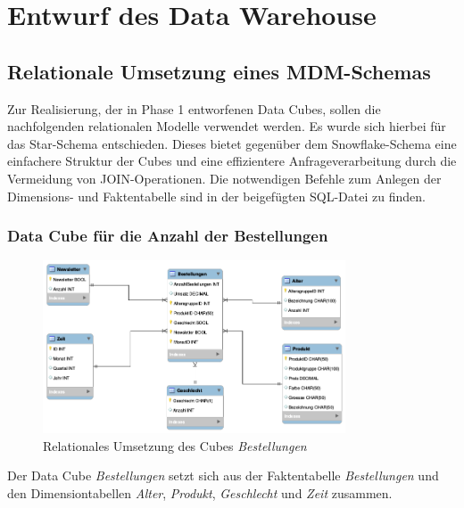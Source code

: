 \section{Entwurf des Data Warehouse}
\subsection{Relationale Umsetzung eines MDM-Schemas}
Zur Realisierung, der in Phase 1 entworfenen Data Cubes, sollen die nachfolgenden relationalen Modelle verwendet werden. Es wurde sich hierbei für das Star-Schema entschieden. Dieses bietet gegenüber dem Snowflake-Schema eine einfachere Struktur der Cubes und eine effizientere Anfrageverarbeitung durch die Vermeidung von JOIN-Operationen.  Die notwendigen Befehle zum Anlegen der Dimensions- und Faktentabelle sind in der beigefügten SQL-Datei zu finden. 

\subsubsection{Data Cube für die Anzahl der Bestellungen}
\begin{figure}[htbp] 
    \centering
       \includegraphics[width=0.8\textwidth]{phase2/dwh-bestellungen.png}
    \caption{Relationales Umsetzung des Cubes \textit{Bestellungen}}
    \label{fig:bestellungen}
  \end{figure} 
   
Der Data Cube \textit{Bestellungen} setzt sich aus der Faktentabelle \textit{Bestellungen} und den Dimensiontabellen \textit{Alter}, \textit{Produkt}, \textit{Geschlecht} und \textit{Zeit} zusammen.
\pagebreak

